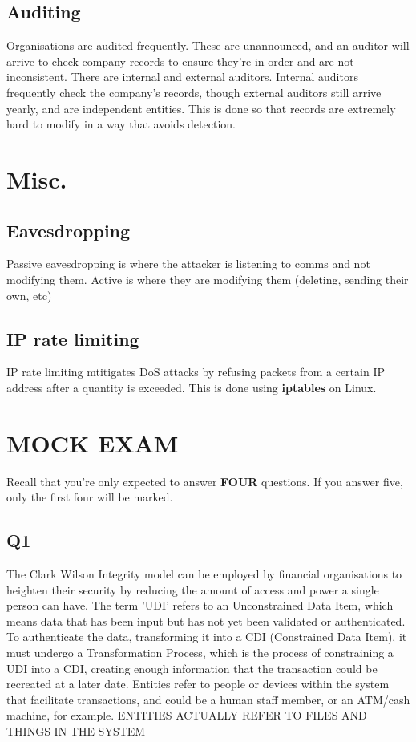 \documentclass[12pt]{report}
\begin{document}
\section{Auditing}
Organisations are audited frequently. These are unannounced, and an auditor will arrive to check company records to ensure they're in order and
are not inconsistent. There are internal and external auditors. Internal auditors frequently check the company's records, though external auditors still
arrive yearly, and are independent entities. This is done so that records are extremely hard to modify in a way that avoids detection.

\chapter*{Misc.}
\addtocounter{chapter}{-11}
\section{Eavesdropping}
Passive eavesdropping is where the attacker is listening to comms and not modifying them. Active is where they are modifying them (deleting, sending their own, etc)
\section{IP rate limiting}
IP rate limiting mtitigates DoS attacks by refusing packets from a certain IP address after a quantity is exceeded. This is done using \textbf{iptables} on Linux.

\chapter{\textbf{MOCK EXAM}}
Recall that you're only expected to answer \textbf{FOUR} questions. If you answer five, only the first four will be marked.

\section{Q1}
The Clark Wilson Integrity model can be employed by financial organisations to heighten their security by reducing the amount of access and power a single person can have. The term 'UDI' refers to an Unconstrained Data Item, which means data that has been input but has not yet been validated or authenticated. To authenticate the data, transforming it into a CDI (Constrained Data Item), it must undergo a Transformation Process, which is the process of constraining a UDI into a CDI, creating enough information that the transaction could be recreated at a later date. Entities refer to people or devices within the system that facilitate transactions, and could be a human staff member, or an ATM/cash machine, for example. ENTITIES ACTUALLY REFER TO FILES AND THINGS IN THE SYSTEM
\end{document}
